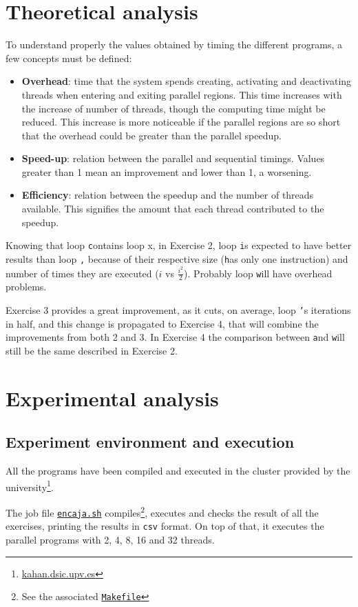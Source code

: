 \documentclass[a4paper]{article}
\newcommand{\github}{https://github.com/kauron/etsinf3/tree/master/CPA/lab2}
\newcommand{\gitname}[1]{\texttt{\href{\github /#1}{#1}}}
\newcommand{\m}[1]{\texttt{#1}}
\newcommand{\x}[1]{\m{#1}}
\renewcommand{\j}[1]{\m{#1}}
\begin{document}
\section{Theoretical analysis}
\label{sec:theoretical}
To understand properly the values obtained by timing the different programs, a few concepts must be defined:
\begin{itemize}
	\item \textbf{Overhead}: time that the system spends creating, activating and deactivating threads when entering and exiting parallel regions. This time increases with the increase of number of threads, though the computing time might be reduced. This increase is more noticeable if the parallel regions are so short that the overhead could be greater than the parallel speedup.
	\item \textbf{Speed-up}: relation between the parallel and sequential timings. Values greater than 1 mean an improvement and lower than 1, a worsening.
	\item \textbf{Efficiency}: relation between the speedup and the number of threads available. This signifies the amount that each thread contributed to the speedup.
\end{itemize}

Knowing that loop \j contains loop {x}, in Exercise 2, loop \j is expected to have better results than loop \x, because of their respective size (\x has only one instruction) and number of times they are executed ($i$ vs $\frac{i^2}{2}$). Probably loop \x will have overhead problems.

Exercise 3 provides a great improvement, as it cuts, on average, loop \x's iterations in half, and this change is propagated to Exercise 4, that will combine the improvements from both 2 and 3. In Exercise 4 the comparison between \x and \j will still be the same described in Exercise 2.

\section{Experimental analysis}
\subsection{Experiment environment and execution}
All the programs have been compiled and executed in the cluster provided by the university\footnote{\url{kahan.dsic.upv.es}}.

The job file \gitname{encaja.sh} compiles\footnote{See the associated \gitname{Makefile}}, executes and checks the result of all the exercises, printing the results in \m{csv} format. On top of that, it executes the parallel programs with 2, 4, 8, 16 and 32 threads.
\end{document}
